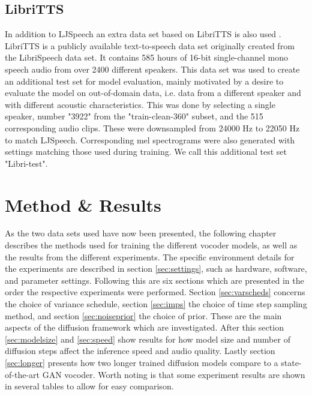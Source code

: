 \documentclass{report}
\begin{document}


\section{LibriTTS}

In addition to LJSpeech an extra data set based on LibriTTS is also used \cite{zen2019libritts}. LibriTTS is a publicly available text-to-speech data set originally created from the LibriSpeech data set. It contains 585 hours of 16-bit single-channel mono speech audio from over 2400 different speakers. This data set was used to create an additional test set for model evaluation, mainly motivated by a desire to evaluate the model on out-of-domain data, i.e. data from a different speaker and with different acoustic characteristics. This was done by selecting a single speaker, number "3922" from the "train-clean-360" subset, and the 515 corresponding audio clips. These were downsampled from 24000 Hz to 22050 Hz to match LJSpeech. Corresponding mel spectrograms were also generated with settings matching those used during training. We call this additional test set "Libri-test".


\newpage
\chapter{Method \& Results} \label{sec:method}

As the two data sets used have now been presented, the following chapter describes the methods used for training the different vocoder models, as well as the results from the different experiments. The specific environment details for the experiments are described in section \ref{sec:settings}, such as hardware, software, and parameter settings. Following this are six sections which are presented in the order the respective experiments were performed. Section \ref{sec:varscheds} concerns the choice of variance schedule, section \ref{sec:imps} the choice of time step sampling method, and section \ref{sec:noiseprior} the choice of prior. These are the main aspects of the diffusion framework which are investigated. After this section \ref{sec:modelsize} and \ref{sec:speed} show results for how model size and number of diffusion steps affect the inference speed and audio quality. Lastly section \ref{sec:longer} presents how two longer trained diffusion models compare to a state-of-the-art GAN vocoder. Worth noting is that some experiment results are shown in several tables to allow for easy comparison.
\end{document}

